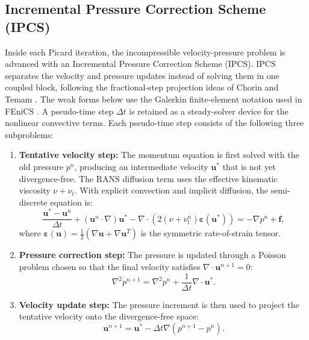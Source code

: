\subsection{Incremental Pressure Correction Scheme (IPCS)}
Inside each Picard iteration, the incompressible velocity-pressure problem is advanced with an Incremental Pressure Correction Scheme (IPCS). IPCS separates the velocity and pressure updates instead of solving them in one coupled block, following the fractional-step projection ideas of Chorin \cite{Chorin1968} and Temam \cite{Temam1969}. The weak forms below use the Galerkin finite-element notation used in FEniCS \cite{Logg2012,Langtangen2016}. A pseudo-time step $\Delta t$ is retained as a steady-solver device for the nonlinear convective terms. Each pseudo-time step consists of the following three subproblems:
\begin{enumerate}
	\item \textbf{Tentative velocity step:} The momentum equation is first solved with the old pressure $p^n$, producing an intermediate velocity $\mathbf{u}^*$ that is not yet divergence-free. The RANS diffusion term uses the effective kinematic viscosity $\nu+\nu_t$. With explicit convection and implicit diffusion, the semi-discrete equation is:
	\begin{equation}
		\frac{\mathbf{u}^* - \mathbf{u}^n}{\Delta t} + (\mathbf{u}^n \cdot \nabla) \mathbf{u}^* - \nabla \cdot \left( 2(\nu + \nu_t^n)\boldsymbol{\varepsilon}(\mathbf{u}^*) \right) = -\nabla p^n + \mathbf{f},
	\end{equation}
	where $\boldsymbol{\varepsilon}(\mathbf{u})=\frac{1}{2}\left(\nabla\mathbf{u}+\nabla\mathbf{u}^{T}\right)$ is the symmetric rate-of-strain tensor.
	
	\item \textbf{Pressure correction step:} The pressure is updated through a Poisson problem chosen so that the final velocity satisfies $\nabla\cdot\mathbf{u}^{n+1}=0$:
	\begin{equation}
		\nabla^2 p^{n+1} = \nabla^2 p^n + \frac{1}{\Delta t} \nabla \cdot \mathbf{u}^* .
	\end{equation}
	
	\item \textbf{Velocity update step:} The pressure increment is then used to project the tentative velocity onto the divergence-free space:
	\begin{equation}
		\mathbf{u}^{n+1} = \mathbf{u}^* - \Delta t \nabla (p^{n+1} - p^n) .
	\end{equation}
\end{enumerate}

